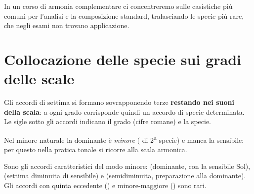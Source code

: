 In un corso di armonia complementare ci concentreremo sulle casistiche più comuni per l'analisi e la composizione standard, tralasciando le specie più rare, che negli esami non trovano applicazione.

\section{Collocazione delle specie sui gradi delle scale}
\label{sec:collocazione_scale}

Gli accordi di settima si formano sovrapponendo terze \textbf{restando nei suoni della scala}: a ogni grado corrisponde quindi un accordo di specie determinata. Le sigle sotto gli accordi indicano il grado (cifre romane) e la specie.

\begin{esempio}
	\label{ex:scala_do}
\end{esempio}

\begin{esempio}
	\label{ex:scala_lan}
	Nel minore naturale la dominante è \emph{minore} ( di 2\textsuperscript{a} specie) e manca la sensibile: per questo nella pratica tonale si ricorre alla scala armonica.
\end{esempio}

\begin{esempio}
	\label{ex:scala_la_arm}
	Sono gli accordi caratteristici del modo minore:  (dominante, con la sensibile Sol\diesis),  (settima diminuita di sensibile) e  (semidiminuita, preparazione alla dominante). Gli accordi con quinta eccedente () e minore-maggiore () sono rari.
\end{esempio}

\begin{esempio}
	\label{ex:scala_la_mel}
\end{esempio}

